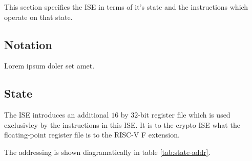 
This section specifies the ISE in terms of it's state and the instructions
which operate on that state.

\subsection{Notation}

Lorem ipsum doler set amet.


\subsection{State}

The ISE introduces an additional $16$ by $32$-bit register file which
is used exclusivley by the instructions in this ISE. It is to the
crypto ISE what the floating-point register file is to the RISC-V
F extension.

The addressing is shown diagramatically in table \ref{tab:state-addr}.

